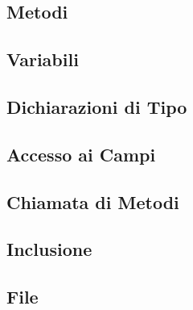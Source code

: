 \subsection{Metodi}

\subsection{Variabili}

\subsection{Dichiarazioni di Tipo}

\subsection{Accesso ai Campi}

\subsection{Chiamata di Metodi}

\subsection{Inclusione}

\subsection{File}
